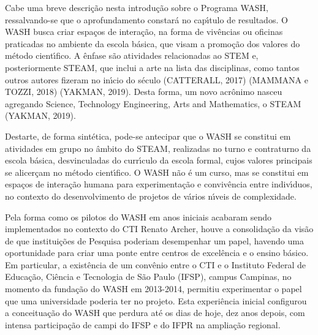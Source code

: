 \documentclass[
12pt,		%
openright,	%
twoside,  %
a4paper,			%
chapter=TITLE,		%
english,			%
french,				%
spanish,			%
brazil				%
]{USPSC-classe/USPSC}
\begin{document}
Cabe uma breve descri\c{c}\~ao nesta introdu\c{c}\~ao sobre o Programa WASH, ressalvando-se que o aprofundamento constar\'a no cap\'{\i}tulo de resultados. O WASH busca criar espa\c{c}os de intera\c{c}\~ao, na forma de  viv\^encias ou oficinas praticadas no ambiente da escola b\'asica, que visam a promo\c{c}\~ao dos valores do m\'etodo cient\'{\i}fico. A \^enfase s\~ao atividades relacionadas ao STEM e, posteriormente STEAM, que inclui a arte na lista das disciplinas, como tantos outros autores fizeram no in\'{\i}cio do s\'eculo  (CATTERALL, 2017) (MAMMANA e TOZZI, 2018)  (YAKMAN, 2019). Desta forma, um novo acr\^onimo nasceu agregando Science, Technology Engineering, Arts and Mathematics, o STEAM  (YAKMAN, 2019).

















Destarte, de forma sint\'etica, pode-se antecipar que o WASH se constitui em atividades em grupo no \^ambito do STEAM, realizadas no turno e contraturno da escola b\'asica, desvinculadas do curr\'{\i}culo da escola formal, cujos valores principais se alicer\c{c}am no m\'etodo cient\'{\i}fico. O WASH n\~ao \'e um curso, mas se constitui em espa\c{c}os de intera\c{c}\~ao humana para experimenta\c{c}\~ao e conviv\^encia entre indiv\'{\i}duos, no contexto do desenvolvimento de projetos de v\'arios n\'{\i}veis de complexidade.

















Pela forma como os pilotos do WASH em anos iniciais acabaram sendo implementados no contexto do CTI Renato Archer, houve a consolida\c{c}\~ao da vis\~ao de que institui\c{c}\~oes de Pesquisa poderiam desempenhar um papel, havendo uma oportunidade para criar uma ponte entre centros de excel\^encia e o ensino b\'asico. Em particular, a exist\^encia de um conv\^enio entre o CTI e o Instituto Federal de Educa\c{c}\~ao, Ci\^encia e Tecnologia de S\~ao Paulo (IFSP), campus Campinas, no momento da funda\c{c}\~ao do WASH em 2013-2014, permitiu experimentar o papel que uma universidade poderia ter no projeto. Esta experi\^encia inicial configurou a conceitua\c{c}\~ao do WASH que perdura at\'e os dias de hoje, dez anos depois, com intensa participa\c{c}\~ao de campi do IFSP e do IFPR na amplia\c{c}\~ao regional.
\end{document}
